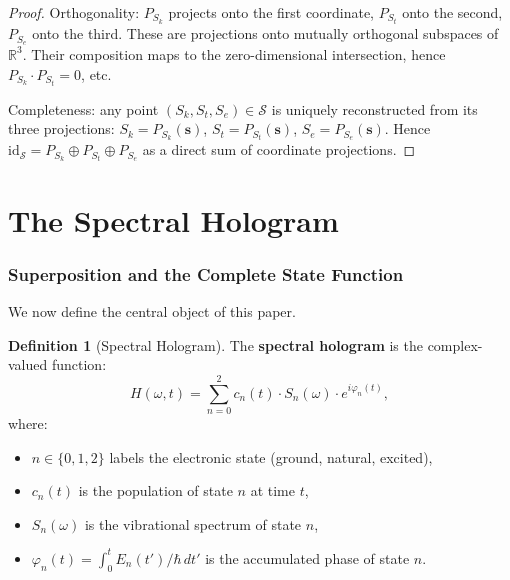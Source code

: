 \documentclass[11pt,twocolumn,a4paper]{article}
\theoremstyle{definition}
\newtheorem{definition}[theorem]{Definition}
\theoremstyle{remark}
\newcommand{\Sk}{S_k}
\newcommand{\St}{S_t}
\newcommand{\Se}{S_e}
\newcommand{\Sspace}{\mathcal{S}}
\begin{document}
\begin{proof}
Orthogonality: $P_{\Sk}$ projects onto the first coordinate, $P_{\St}$ onto the second, $P_{\Se}$ onto the third. These are projections onto mutually orthogonal subspaces of $\mathbb{R}^3$. Their composition maps to the zero-dimensional intersection, hence $P_{\Sk} \cdot P_{\St} = 0$, etc.

Completeness: any point $(\Sk, \St, \Se) \in \Sspace$ is uniquely reconstructed from its three projections: $\Sk = P_{\Sk}(\mathbf{s})$, $\St = P_{\St}(\mathbf{s})$, $\Se = P_{\Se}(\mathbf{s})$. Hence $\mathrm{id}_{\Sspace} = P_{\Sk} \oplus P_{\St} \oplus P_{\Se}$ as a direct sum of coordinate projections.
\end{proof}


\part{The Spectral Hologram}

\section{Superposition and the Complete State Function}
\label{sec:hologram}

We now define the central object of this paper.

\begin{definition}[Spectral Hologram]
\label{def:hologram}
The \textbf{spectral hologram} is the complex-valued function:
\begin{equation}
\label{eq:hologram}
H(\omega, t) = \sum_{n=0}^{2} c_n(t) \cdot S_n(\omega) \cdot e^{i\varphi_n(t)},
\end{equation}
where:
\begin{itemize}
  \item $n \in \{0, 1, 2\}$ labels the electronic state (ground, natural, excited),
  \item $c_n(t)$ is the population of state $n$ at time $t$,
  \item $S_n(\omega)$ is the vibrational spectrum of state $n$,
  \item $\varphi_n(t) = \int_0^t E_n(t')/\hbar \, dt'$ is the accumulated phase of state $n$.
\end{itemize}
\end{definition}
\end{document}
